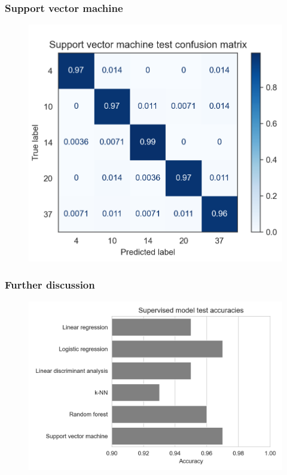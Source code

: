 \documentclass{beamer}
\begin{document}
    \begin{frame}
        \frametitle{Support vector machine}
        \begin{figure}
            \centering
            \includegraphics[width=0.6\linewidth]{svm.png}
        \end{figure}
    \end{frame}

    \begin{frame}
        \frametitle{Further discussion}
        \begin{figure}
            \begin{flushleft}
                \includegraphics[width=0.8\linewidth]{accuracies.png}
            \end{flushleft}
        \end{figure}
    \end{frame}
\end{document}
